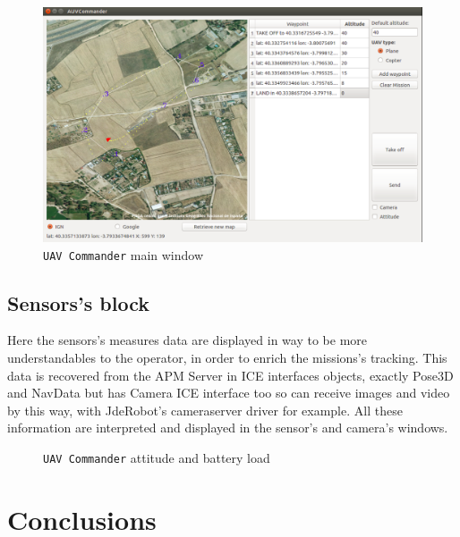 \documentclass{llncs}
\begin{document}
\begin{figure}
  \centering
  \includegraphics[scale=0.33]{img/uavc_mission.png}
  \caption{\texttt{UAV Commander} main window}
  \label{fig:uavc_ppal}
\end{figure}

\subsection{Sensors's block}
\label{sensors_block}

Here the sensors's measures data are displayed in way to be more understandables to the operator, in order to enrich the missions's tracking. This data is recovered from the APM Server in ICE interfaces objects, exactly Pose3D and NavData but has Camera ICE interface too so can receive images and video by this way, with JdeRobot's cameraserver driver for example. All these information are interpreted and displayed in the sensor's and camera's windows.

\begin{figure}
    \caption{\texttt{UAV Commander} attitude and battery load}
  
\end{figure}

\section{Conclusions}
\end{document}
